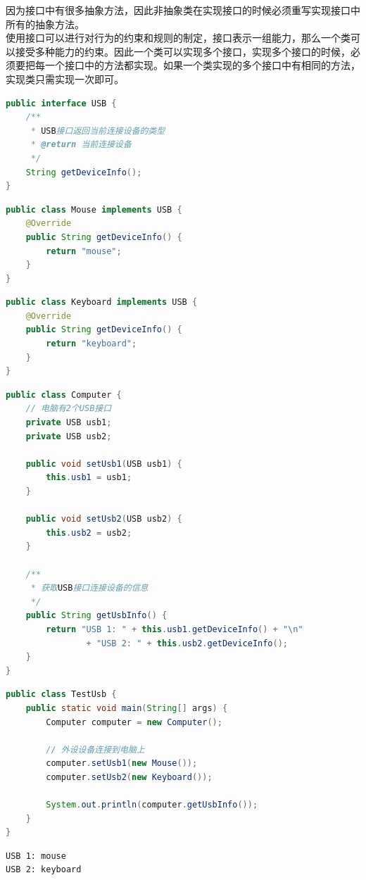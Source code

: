 因为接口中有很多抽象方法，因此非抽象类在实现接口的时候必须重写实现接口中所有的抽象方法。 \\

使用接口可以进行对行为的约束和规则的制定，接口表示一组能力，那么一个类可以接受多种能力的约束。因此一个类可以实现多个接口，实现多个接口的时候，必须要把每一个接口中的方法都实现。如果一个类实现的多个接口中有相同的方法，实现类只需实现一次即可。 \\


\begin{lstlisting}[language=Java, title=USB.java]
public interface USB {
    /**
     * USB接口返回当前连接设备的类型
     * @return 当前连接设备
     */
    String getDeviceInfo();
}
\end{lstlisting}

\begin{lstlisting}[language=Java, title=Mouse.java]
public class Mouse implements USB {
    @Override
    public String getDeviceInfo() {
        return "mouse";
    }
}
\end{lstlisting}

\begin{lstlisting}[language=Java, title=Keyboard.java]
public class Keyboard implements USB {
    @Override
    public String getDeviceInfo() {
        return "keyboard";
    }
}
\end{lstlisting}

\begin{lstlisting}[language=Java, title=Computer.java]
public class Computer {
    // 电脑有2个USB接口
    private USB usb1;
    private USB usb2;
    
    public void setUsb1(USB usb1) {
        this.usb1 = usb1;
    }
    
    public void setUsb2(USB usb2) {
        this.usb2 = usb2;
    }
    
    /**
     * 获取USB接口连接设备的信息
     */
    public String getUsbInfo() {
        return "USB 1: " + this.usb1.getDeviceInfo() + "\n"
                + "USB 2: " + this.usb2.getDeviceInfo();
    }
}
\end{lstlisting}

\begin{lstlisting}[language=Java, title=TestUsb.java]
public class TestUsb {
    public static void main(String[] args) {
        Computer computer = new Computer();
        
        // 外设设备连接到电脑上
        computer.setUsb1(new Mouse());
        computer.setUsb2(new Keyboard());
        
        System.out.println(computer.getUsbInfo());
    }
}
\end{lstlisting}

\begin{tcolorbox}
	\begin{verbatim}
USB 1: mouse
USB 2: keyboard
	\end{verbatim}
\end{tcolorbox}

\newpage